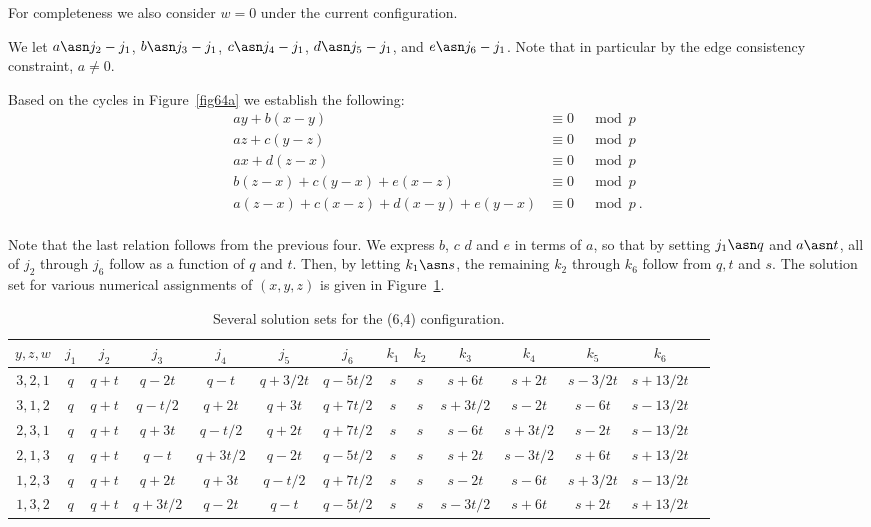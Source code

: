 { For completeness we also consider $w=0$ under the current
 configuration.

 We let $a \asn j_2-j_1$, $b \asn j_3-j_1$, $c \asn j_4-j_1$,
 $d \asn j_5-j_1$, and $e \asn j_6-j_1$.  Note that in particular
 by the edge consistency constraint, $a \neq 0$.

Based on the cycles in Figure~\ref{fig64a} we establish the
following:
 \begin{equation}\label{sys31a}\begin{array}{ccccc}
 ay+b(x-y) &\equiv 0 &\mod p\\
 az+c(y-z)  &\equiv 0 &\mod p\\
 ax+d(z-x) &\equiv 0 &\mod p\\
 b(z-x)+c(y-x)+e(x-z) &\equiv 0 &\mod p\\
 a(z-x)+c(x-z)+d(x-y)+e(y-x) &\equiv 0 &\mod p~.\\
 \end{array}\end{equation}


Note that the last relation follows from the previous four. We
express $b$, $c$ $d$ and $e$ in terms of $a$, so that by setting
$j_1 \asn q$ and $a \asn t$, all of $j_2$ through $j_6$ follow as
a function of $q$ and $t$. Then, by letting $k_1 \asn s$, the
remaining $k_2$ through $k_6$ follow from $q,t$ and $s$. The
solution set for various numerical assignments of $(x,y,z)$ is
given in Figure~\ref{table641}.

\hspace{-0.2in}\small{\hspace{-0.2in}\begin{table}[ht]\vspace{-0.05in}\hspace{-0.2in}
\begin{tabular}{|c |c|c|c|c|c|c|c|c|c|c|c|c|c|}
  \hline
  $y,z,w$ & $j_1$ & $j_2$ & $j_3$ & $j_4$ & $j_5$ & $j_6$ & $k_1$ & $k_2$ & $k_3$ & $k_4$ & $k_5$ & $k_6$ \\
  \hline
    $3,2,1$ & $q$ &$q+t$ & $q-2t$ & $q-t$& $q+3/2t$ &$q-5t/2$ & $s$ &$s$ &   $s+6t$ & $s+2t$ & $s-3/2t$ &
    $s+13/2t$\\
     $3,1,2$ & $q$ &$q+t$ & $q-t/2$ & $q+2t$& $q+3t$ &$q+7t/2$ & $s$ &$s$ &   $s+3t/2$ & $s-2t$ & $s-6t$ &
    $s-13/2t$\\
     $2,3,1$ & $q$ &$q+t$ & $q+3t$ & $q-t/2$& $q+2t$ &$q+7t/2$ & $s$ &$s$ &   $s-6t$ & $s+3t/2$ & $s-2t$ &
    $s-13/2t$\\
     $2,1,3$ & $q$ &$q+t$ & $q-t$ & $q+3t/2$& $q-2t$ &$q-5t/2$ & $s$ &$s$ &   $s+2t$ & $s-3t/2$ & $s+6t$ &
    $s+13/2t$\\
     $1,2,3$ & $q$ &$q+t$ & $q+2t$ & $q+3t$& $q-t/2$ &$q+7t/2$ & $s$ &$s$ &   $s-2t$ & $s-6t$ & $s+3/2t$ &
    $s-13/2t$\\
     $1,3,2$ & $q$ &$q+t$ & $q+3t/2$ & $q-2t$& $q-t$ &$q-5t/2$ & $s$ &$s$ &   $s-3t/2$ & $s+6t$ & $s+2t$ &
    $s+13/2t$\\
  \hline
\end{tabular}
\caption{ Several solution sets for the (6,4)
configuration.}\label{table641}
\end{table}}
\normalsize

}
